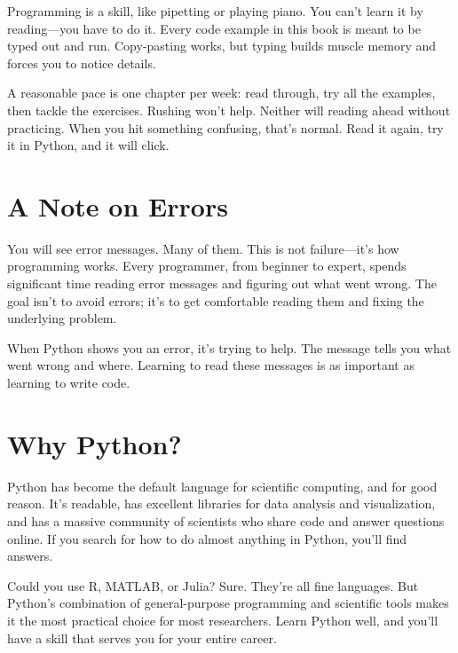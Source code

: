Programming is a skill, like pipetting or playing piano. You can't learn it by reading---you have to do it. Every code example in this book is meant to be typed out and run. Copy-pasting works, but typing builds muscle memory and forces you to notice details.

A reasonable pace is one chapter per week: read through, try all the examples, then tackle the exercises. Rushing won't help. Neither will reading ahead without practicing. When you hit something confusing, that's normal. Read it again, try it in Python, and it will click.

\section*{A Note on Errors}

You will see error messages. Many of them. This is not failure---it's how programming works. Every programmer, from beginner to expert, spends significant time reading error messages and figuring out what went wrong. The goal isn't to avoid errors; it's to get comfortable reading them and fixing the underlying problem.

When Python shows you an error, it's trying to help. The message tells you what went wrong and where. Learning to read these messages is as important as learning to write code.

\section*{Why Python?}

Python has become the default language for scientific computing, and for good reason. It's readable, has excellent libraries for data analysis and visualization, and has a massive community of scientists who share code and answer questions online. If you search for how to do almost anything in Python, you'll find answers.

Could you use R, MATLAB, or Julia? Sure. They're all fine languages. But Python's combination of general-purpose programming and scientific tools makes it the most practical choice for most researchers. Learn Python well, and you'll have a skill that serves you for your entire career.
